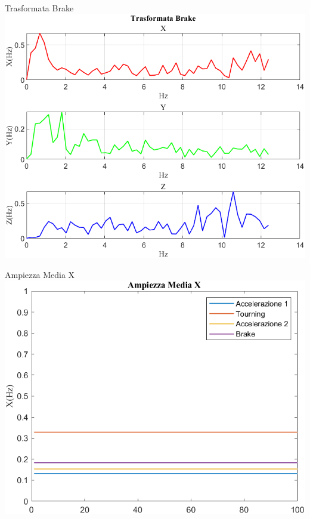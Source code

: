 \documentclass[beamer]{standalone}
\begin{document}
	\begin{frame}{{Trasformata Brake}}
		\centering\includegraphics[height=.8\textheight]{figure/Acc/Trasformata/Trasformata Brake}
	\end{frame}
	
	\begin{frame}{{Ampiezza Media X}}
			\centering\includegraphics[height=.8\textheight]{figure/Acc/Trasformata/Ampiezza MediaX}
	\end{frame}
\end{document}

